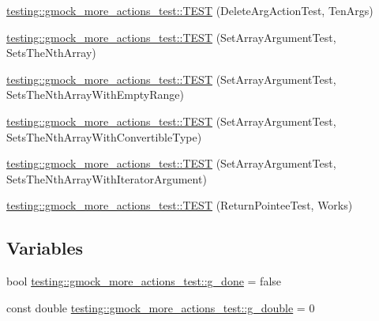 \begin{DoxyCompactItemize}
\item 
\mbox{\hyperlink{namespacetesting_1_1gmock__more__actions__test_a972b47a7e96b95606190afa928ea2db4}{testing\+::gmock\+\_\+more\+\_\+actions\+\_\+test\+::\+T\+E\+ST}} (Delete\+Arg\+Action\+Test, Ten\+Args)
\item 
\mbox{\hyperlink{namespacetesting_1_1gmock__more__actions__test_aacf568e3d16b210aa2316ccc2cb6b22d}{testing\+::gmock\+\_\+more\+\_\+actions\+\_\+test\+::\+T\+E\+ST}} (Set\+Array\+Argument\+Test, Sets\+The\+Nth\+Array)
\item 
\mbox{\hyperlink{namespacetesting_1_1gmock__more__actions__test_a63a338ef41086b80dba5729ecd1073e5}{testing\+::gmock\+\_\+more\+\_\+actions\+\_\+test\+::\+T\+E\+ST}} (Set\+Array\+Argument\+Test, Sets\+The\+Nth\+Array\+With\+Empty\+Range)
\item 
\mbox{\hyperlink{namespacetesting_1_1gmock__more__actions__test_a42955fc99954c095f9d7ded3b92c091f}{testing\+::gmock\+\_\+more\+\_\+actions\+\_\+test\+::\+T\+E\+ST}} (Set\+Array\+Argument\+Test, Sets\+The\+Nth\+Array\+With\+Convertible\+Type)
\item 
\mbox{\hyperlink{namespacetesting_1_1gmock__more__actions__test_a5db6a5413414f6d9bb8a24d1f07bf882}{testing\+::gmock\+\_\+more\+\_\+actions\+\_\+test\+::\+T\+E\+ST}} (Set\+Array\+Argument\+Test, Sets\+The\+Nth\+Array\+With\+Iterator\+Argument)
\item 
\mbox{\hyperlink{namespacetesting_1_1gmock__more__actions__test_a690ef20bd9c281781eddcf99b18cff6c}{testing\+::gmock\+\_\+more\+\_\+actions\+\_\+test\+::\+T\+E\+ST}} (Return\+Pointee\+Test, Works)
\end{DoxyCompactItemize}
\subsection*{Variables}
\begin{DoxyCompactItemize}
\item 
bool \mbox{\hyperlink{namespacetesting_1_1gmock__more__actions__test_ab2d168581c62c89bd00cdadcccd9e8e4}{testing\+::gmock\+\_\+more\+\_\+actions\+\_\+test\+::g\+\_\+done}} = false
\item 
const double \mbox{\hyperlink{namespacetesting_1_1gmock__more__actions__test_a73552112032ff5d5900dd6f128a62718}{testing\+::gmock\+\_\+more\+\_\+actions\+\_\+test\+::g\+\_\+double}} = 0
\end{DoxyCompactItemize}
